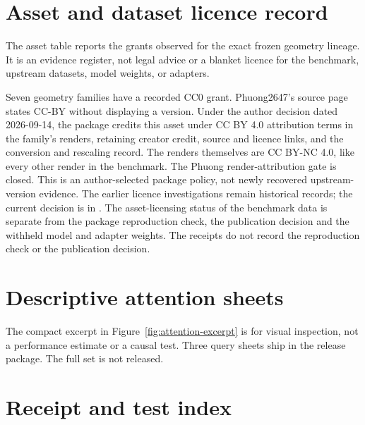 

\clearpage
\section{Asset and dataset licence record}
\label{app:licences}

The asset table reports the grants observed for the exact frozen geometry
lineage. It is an evidence register, not legal advice or a blanket licence for
the benchmark, upstream datasets, model weights, or adapters.

Seven geometry families have a recorded CC0 grant. Phuong2647's source page
states CC-BY without displaying a version. Under the author decision dated
2026-09-14, the package credits this asset under CC BY 4.0 attribution terms
in the family's renders, retaining creator credit, source and licence links, and
the conversion and rescaling record. The renders themselves are CC BY-NC 4.0,
like every other render in the benchmark. The Phuong render-attribution gate is
closed. This is an
author-selected package policy, not newly recovered upstream-version evidence.
The earlier licence investigations remain historical records; the current decision
is in .
The asset-licensing status of the benchmark data is separate from the package
reproduction check, the publication decision and the withheld model and adapter
weights. The receipts do not record the reproduction check or the publication
decision.



\clearpage
\section{Descriptive attention sheets}
\label{app:attention}

The compact excerpt in Figure~\ref{fig:attention-excerpt} is for visual inspection, not a performance estimate
or a causal test. Three query sheets ship in the release package. The full set is not released.



\FloatBarrier
\clearpage
\section{Receipt and test index}
\label{app:receipts}

